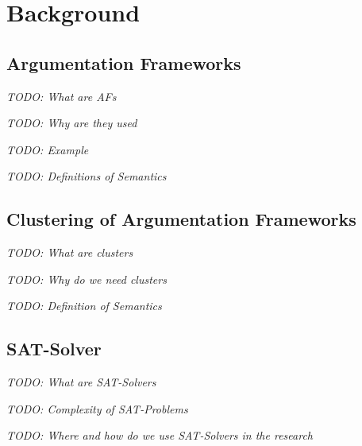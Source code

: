 \chapter{Background}

\section{Argumentation Frameworks}

\textit{TODO: What are AFs}

\textit{TODO: Why are they used}

\textit{TODO: Example}

\textit{TODO: Definitions of Semantics}



\section{Clustering of Argumentation Frameworks}

\textit{TODO: What are clusters}

\textit{TODO: Why do we need clusters}

\textit{TODO: Definition of Semantics}



\section{SAT-Solver}

\textit{TODO: What are SAT-Solvers}

\textit{TODO: Complexity of SAT-Problems}

\textit{TODO: Where and how do we use SAT-Solvers in the research}


